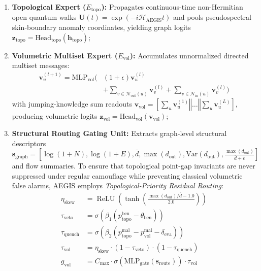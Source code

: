 \documentclass[10pt,twocolumn,letterpaper]{article}
\begin{document}
\begin{enumerate}
    \item \textbf{Topological Expert ($E_{\text{topo}}$):} Propagates continuous-time non-Hermitian open quantum walks $\mathbf{U}(t) = \exp(-i \mathcal{H}_{\text{AEGIS}} t)$ and pools pseudospectral skin-boundary anomaly coordinates, yielding graph logits $\mathbf{z}_{\text{topo}} = \mathrm{Head}_{\text{topo}}(\mathbf{h}_{\text{topo}})$;
    \item \textbf{Volumetric Multiset Expert ($E_{\text{vol}}$):} Accumulates unnormalized directed multiset messages:
    \begin{align}
    \mathbf{v}_u^{(l+1)} = \mathrm{MLP}_{\text{vol}}\Big(&(1 + \epsilon) \mathbf{v}_u^{(l)} \nonumber \\
    &+ \sum_{v \in \mathcal{N}_{\text{out}}(u)} \mathbf{v}_v^{(l)} + \sum_{v \in \mathcal{N}_{\text{in}}(u)} \mathbf{v}_v^{(l)}\Big)
    \end{align}
    with jumping-knowledge sum readouts $\mathbf{v}_{\text{vol}} = [\sum_u \mathbf{v}_u^{(1)} \mathbin{\Vert} \dots \mathbin{\Vert} \sum_u \mathbf{v}_u^{(L)}]$, producing volumetric logits $\mathbf{z}_{\text{vol}} = \mathrm{Head}_{\text{vol}}(\mathbf{v}_{\text{vol}})$;
    \item \textbf{Structural Routing Gating Unit:} Extracts graph-level structural descriptors $\mathbf{s}_{\text{graph}} = [\log(1+N), \log(1+E), \bar{d}, \max(d_{\text{out}}), \mathrm{Var}(d_{\text{out}}), \frac{\max(d_{\text{out}})}{\bar{d}+\epsilon}]$ and flow summaries. To ensure that topological point-gap invariants are never suppressed under regular camouflage while preventing classical volumetric false alarms, AEGIS employs \textit{Topological-Priority Residual Routing}:
    \begin{align}
    \eta_{\text{skew}} &= \operatorname{ReLU}\left(\tanh\left(\frac{\max(d_{\text{out}})/\bar{d} - 1.0}{2.0}\right)\right) \\
    \tau_{\text{veto}} &= \sigma\left(\beta_1 (p_{\text{topo}}^{\text{ben}} - \theta_{\text{ben}})\right) \\
    \tau_{\text{quench}} &= \sigma\left(\beta_2 (p_{\text{topo}}^{\text{mal}} - p_{\text{vol}}^{\text{mal}} - \delta_{\text{eva}})\right) \\
    \tau_{\text{vol}} &= \eta_{\text{skew}} \cdot (1 - \tau_{\text{veto}}) \cdot (1 - \tau_{\text{quench}}) \\
    g_{\text{vol}} &= C_{\text{max}} \cdot \sigma\left(\mathrm{MLP}_{\text{gate}}(\mathbf{s}_{\text{route}})\right) \cdot \tau_{\text{vol}} \\

\end{align}
\end{enumerate}
\end{document}
